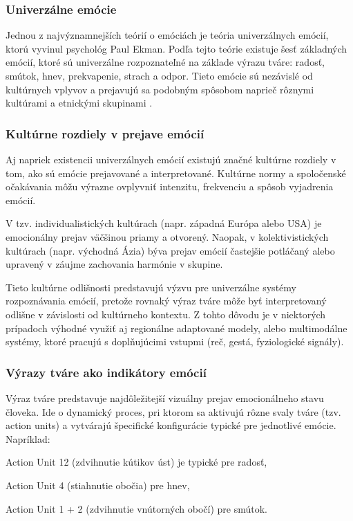 \subsubsection{Univerzálne emócie}
Jednou z najvýznamnejších teórií o emóciách je teória univerzálnych emócií, ktorú vyvinul psychológ Paul Ekman. Podľa tejto teórie existuje šesť základných emócií, ktoré sú univerzálne rozpoznateľné 
na základe výrazu tváre: radosť, smútok, hnev, prekvapenie, strach a odpor​. Tieto emócie sú nezávislé od kultúrnych vplyvov a prejavujú sa podobným spôsobom naprieč rôznymi kultúrami a etnickými skupinami \cite{article03}.
\subsubsection{Kultúrne rozdiely v prejave emócií}
Aj napriek existencii univerzálnych emócií existujú značné kultúrne rozdiely v tom, ako sú emócie prejavované a interpretované. Kultúrne normy a spoločenské očakávania môžu výrazne ovplyvniť intenzitu, frekvenciu a spôsob vyjadrenia emócií.

V tzv. individualistických kultúrach (napr. západná Európa alebo USA) je emocionálny prejav väčšinou priamy a otvorený. Naopak, v kolektivistických kultúrach (napr. východná Ázia) býva prejav emócií častejšie potláčaný alebo upravený v 
záujme zachovania harmónie v skupine​.

Tieto kultúrne odlišnosti predstavujú výzvu pre univerzálne systémy rozpoznávania emócií, pretože rovnaký výraz tváre môže byť interpretovaný odlišne v závislosti od kultúrneho kontextu. Z tohto dôvodu je v niektorých prípadoch výhodné využiť aj regionálne 
adaptované modely, alebo multimodálne systémy, ktoré pracujú s doplňujúcimi vstupmi (reč, gestá, fyziologické signály).

\subsubsection{Výrazy tváre ako indikátory emócií}
Výraz tváre predstavuje najdôležitejší vizuálny prejav emocionálneho stavu človeka. Ide o dynamický proces, pri ktorom sa aktivujú rôzne svaly tváre (tzv. action units) a vytvárajú špecifické konfigurácie typické pre jednotlivé emócie. Napríklad:

Action Unit 12 (zdvihnutie kútikov úst) je typické pre radosť,

Action Unit 4 (stiahnutie obočia) pre hnev,

Action Unit 1 + 2 (zdvihnutie vnútorných obočí) pre smútok.

